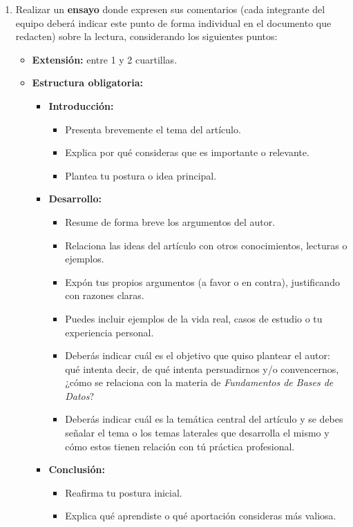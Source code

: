 \documentclass[12pt]{report}
\begin{document}
\begin{enumerate}[label=\textbf{\arabic*.}, leftmargin=*]
\begin{enumerate}[label=\textbf{\alph*.}, leftmargin=*, itemsep=1.0em]
\item Realizar un \textbf{ensayo} donde expresen sus comentarios (cada integrante del equipo deber\'a indicar este punto de forma individual en el documento que redacten) sobre la lectura, considerando los siguientes puntos:

\begin{itemize}
  \item \textbf{Extensi\'on:} entre 1 y 2 cuartillas.
  \item \textbf{Estructura obligatoria:}
  \begin{itemize}
    \item \textbf{Introducci\'on:}
    \begin{itemize}
      \item Presenta brevemente el tema del art\'iculo.
      \item Explica por qu\'e consideras que es importante o relevante.
      \item Plantea tu postura o idea principal.
    \end{itemize}
    \item \textbf{Desarrollo:}
    \begin{itemize}
      \item Resume de forma breve los argumentos del autor.
      \item Relaciona las ideas del art\'iculo con otros conocimientos, lecturas o ejemplos.
      \item Exp\'on tus propios argumentos (a favor o en contra), justificando con razones claras.
      \item Puedes incluir ejemplos de la vida real, casos de estudio o tu experiencia personal.
      \item Deber\'as indicar cu\'al es el objetivo que quiso plantear el autor: qu\'e intenta decir, de qu\'e intenta persuadirnos y/o convencernos, ¿c\'omo se relaciona con la materia de \textit{Fundamentos de Bases de Datos}?
      \item Deber\'as indicar cu\'al es la tem\'atica central del art\'iculo y se debes se\~nalar el tema o los temas laterales que desarrolla el mismo y c\'omo estos tienen relaci\'on con t\'u pr\'actica profesional.
    \end{itemize}
    \item \textbf{Conclusi\'on:}
    \begin{itemize}
      \item Reafirma tu postura inicial.
      \item Explica qu\'e aprendiste o qu\'e aportaci\'on consideras m\'as valiosa.

\end{itemize}
\end{itemize}
\end{itemize}
\end{enumerate}
\end{enumerate}
\end{document}
